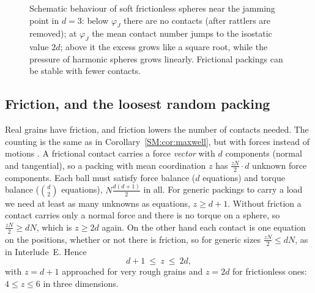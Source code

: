 \begin{figure}[ht]
\centering
{}
\caption{Schematic behaviour of soft frictionless spheres near the jamming point in $d=3$: below $\varphi_J$
there are no contacts (after rattlers are removed); at $\varphi_J$ the mean contact number jumps to the
isostatic value $2d$; above it the excess grows like a square root, while the pressure of harmonic spheres
grows linearly. Frictional packings can be stable with fewer contacts.}
\label{PHYS:fig:jam}
\end{figure}

\subsection*{Friction, and the loosest random packing}
Real grains have friction, and friction lowers the number of contacts needed. The counting is the same as
in Corollary~\ref{SM:cor:maxwell}, but with forces instead of motions . A frictional contact
carries a force \emph{vector} with $d$ components (normal and tangential), so a packing with mean
coordination $z$ has $\frac{zN}2\cdot d$ unknown force components. Each ball must satisfy force balance
($d$ equations) and torque balance ($\binom d2$ equations), $N\frac{d(d+1)}2$ in all. For generic packings
to carry a load we need at least as many unknowns as equations, $z\ge d+1$. Without friction a contact
carries only a normal force and there is no torque on a sphere, so $\frac{zN}2\ge dN$, which is $z\ge2d$
again. On the other hand each contact is one equation on the positions, whether or not there is friction,
so for generic sizes $\frac{zN}2\le dN$, as in Interlude~E. Hence
\[
  d+1\ \le\ z\ \le\ 2d,
\]
with $z=d+1$ approached for very rough grains and $z=2d$ for frictionless ones: $4\le z\le6$ in three
dimensions.

